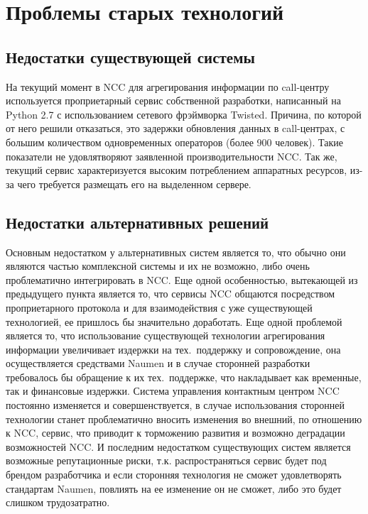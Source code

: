 \section{Проблемы старых технологий}

\subsection{Недостатки существующей системы}

На текущий момент в NCC для агрегирования информации по call-центру используется проприетарный сервис
собственной разработки, написанный на Python 2.7 с использованием сетевого фрэймворка Twisted.
Причина, по которой от него решили отказаться, это задержки обновления данных в call-центрах,
с большим количеством одновременных операторов (более 900 человек).
Такие показатели не удовлятворяют заявленной производительности NCC\@.
Так же, текущий сервис характеризуется высоким потреблением аппаратных ресурсов,
из-за чего требуется размещать его на выделенном сервере.

\subsection{Недостатки альтернативных решений}

Основным недостатком у альтернативных систем является то,
что обычно они являются частью комплексной системы и их не возможно,
либо очень проблематично интегрировать в NCC\@.
Еще одной особенностью, вытекающей из предыдущего пункта является то,
что сервисы NCC общаются посредством проприетарного протокола и для взаимодействия
с уже существующей технологией, ее пришлось бы значительно доработать.
Еще одной проблемой является то, что использование существующей технологии агрегирования информации
увеличивает издержки на тех.~поддержку и сопровождение,
она осуществляется средствами Naumen и в случае сторонней разработки требовалось бы обращение
к их тех.~поддержке, что накладывает как временные, так и финансовые издержки.
Система управления контактным центром NCC постоянно изменяется и совершенствуется,
в случае использования сторонней технологии станет проблематично вносить изменения во внешний,
по отношению к NCC, сервис, что приводит к торможению развития и возможно деградации возможностей NCC.
И последним недостатком существующих систем является возможные репутационные риски,
т.к. распространяться сервис будет под брендом разработчика
и если сторонняя технология не сможет удовлетворять стандартам Naumen,
повлиять на ее изменение он не сможет, либо это будет слишком трудозатратно.

